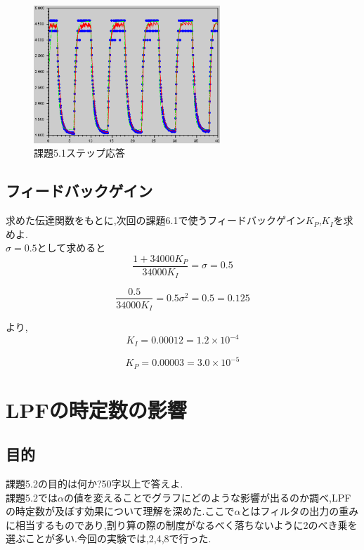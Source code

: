 \documentclass{jarticle}
\begin{document}
\begin{figure}[H]
\begin{center}
\includegraphics[width=7.0cm]{images/kadai5-1-3-simu.eps}
\caption{課題5.1ステップ応答}
\label{fig:kadai5-1-3-simu}
\end{center}
\end{figure}

\subsection{フィードバックゲイン}
求めた伝達関数をもとに,次回の課題6.1で使うフィードバックゲイン$K_P$,$K_I$を求めよ. \\

$\sigma= 0.5$として求めると
\begin{equation}
\frac{1 + 34000K_P}{34000K_I} = \sigma = 0.5
\end{equation}

\begin{equation}
\frac{0.5}{34000K_I} = 0.5\sigma^2 = 0.5 = 0.125
\end{equation}

より,
\begin{equation}
K_I = 0.00012 = 1.2 \times 10 ^{-4}
\end{equation}

\begin{equation}
K_P = 0.00003 = 3.0 \times 10 ^{-5}
\end{equation}
\section{LPFの時定数の影響}
\subsection{目的}
課題5.2の目的は何か?50字以上で答えよ. \\

課題5.2では$\alpha$の値を変えることでグラフにどのような影響が出るのか調べ,LPFの時定数が及ぼす効果について理解を深めた.ここで$\alpha$とはフィルタの出力の重みに相当するものであり,割り算の際の制度がなるべく落ちないように2のべき乗を選ぶことが多い.今回の実験では,2,4,8で行った.
\end{document}

